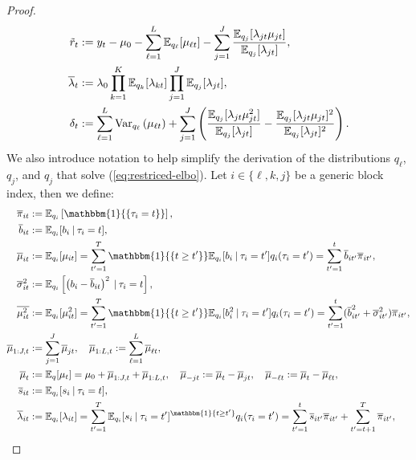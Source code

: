 \begin{proof}
\begin{align}
    \tilde{r}_t &:= y_t -\mu_0- \sum_{\ell = 1}^L \mathbb{E}_{q_\ell}[\mu_{\ell t}] - \sum_{j = 1}^J \frac{\mathbb{E}_{q_j}[\lambda_{jt} \mu_{jt}]}{\mathbb{E}_{q_j}[\lambda_{jt}]}, \label{eq:mod-resid} \\
    \overline{\lambda}_t &:= \lambda_0\prod_{k=1}^K \mathbb{E}_{q_k}[\lambda_{kt}] \prod_{j=1}^J \mathbb{E}_{q_j}[\lambda_{jt}], \label{eq:lambda-bar} \\
    \delta_t &:= \sum_{\ell=1}^L \text{\normalfont Var}_{q_\ell}\left(\mu_{\ell t} \right) +  \sum_{j=1}^J\left(\frac{\mathbb{E}_{q_j}[\lambda_{jt} \mu^2_{jt}]}{\mathbb{E}_{q_j}[\lambda_{jt}]} -\frac{\mathbb{E}_{q_j}[\lambda_{jt} \mu_{jt}]^2}{\mathbb{E}_{q_j}[\lambda_{jt}]^2} \right). \label{eq:delta}
\end{align}
We also introduce notation to help simplify the derivation of the distributions $q_\ell$, $q_j$, and $q_j$ that solve (\ref{eq:restriced-elbo}). Let $i \in \{\ell, k, j\}$ be a generic block index, then we define:
\small
\begin{align*}
    \overline{\pi}_{i t} &:= \E_{q_i}\left[\mathbbm{1}{\left\{\tau_i = t\right\}}\right],\\
    \overline{b}_{i t} &:= \E_{q_i}[b_i \:|\: \tau_i = t], \\
    \overline{\mu}_{it} &:= \E_{q_i}[\mu_{i t}] = \sum_{t'=1}^{T} \mathbbm{1}{\{t \geq t'\}}\E_{q_i}[b_i \:|\:\tau_i = t']q_i(\tau_i =t') = \sum_{t'=1}^t \overline{b}_{i t'} \overline{\pi}_{i t'}, \\
    \overline{\sigma}^2_{it} &:= \E_{q_i}\left[\left(b_i - \overline{b}_{i t}\right)^2\:|\: \tau_i = t\right], \\
    \overline{\mu^2_{it}} &:= \E_{q_i}[\mu^2_{it}] = \sum_{t'=1}^{T} \mathbbm{1}{\{t \geq t'\}}\E_{q_i}[b^2_i \:|\:\tau_i = t']q_i(\tau_i =t') = \sum_{t'=1}^t (\overline{b}^2_{i t'} + \overline{\sigma}^2_{i t'}) \overline{\pi}_{it'}, \\
    \overline{\mu}_{1:J,t} &:= \sum_{j=1}^J \overline{\mu}_{jt}, \quad \overline{\mu}_{1:L,t} := \sum_{\ell=1}^L \overline{\mu}_{\ell t}, \\
    \overline{\mu}_t &:= \E_q[\mu_t] = \mu_0 + \overline{\mu}_{1:J,t} + \overline{\mu}_{1:L,t}, \quad \overline{\mu}_{-jt} := \overline{\mu}_t - \overline{\mu}_{jt}, \quad \overline{\mu}_{-\ell t} := \overline{\mu}_t - \overline{\mu}_{\ell t}, \\
    \overline{s}_{i t} &:= \E_{q_i}[s_i \:|\: \tau_i = t], \\
    \overline{\lambda}_{it} &:= \E_{q_i}[\lambda_{it}] = \sum_{t'=1}^T \E_{q_i}[s_i \:|\: \tau_i = t']^{\mathbbm{1}\{t\geq t'\}} q_i(\tau_i = t') = \sum_{t'=1}^t \overline{s}_{i t'} \overline{\pi}_{i t'} + \sum_{t'=t+1}^T \overline{\pi}_{i t'}, \\

\end{align*}
\end{proof}
